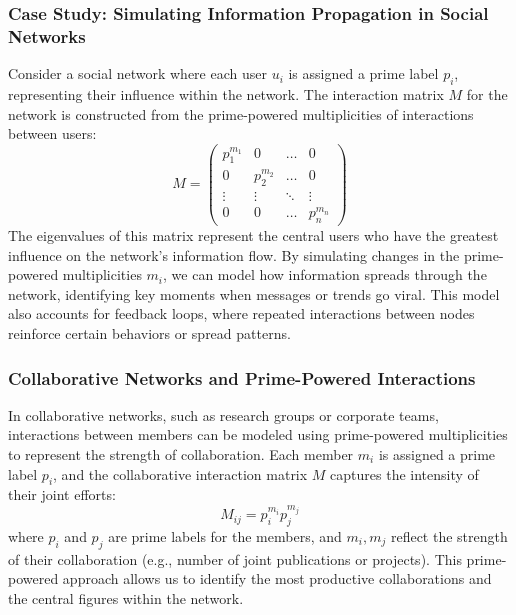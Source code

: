 \documentclass[%
 preprint, linenumbers,
 amsmath,amssymb,
 aps, physrev,
]{revtex4-2}
\begin{document}
\subsubsection{Case Study: Simulating Information Propagation in Social Networks}
Consider a social network where each user \( u_i \) is assigned a prime label \( p_i \), representing their influence within the network. The interaction matrix \( M \) for the network is constructed from the prime-powered multiplicities of interactions between users:
\[
M = \begin{pmatrix} p_1^{m_1} & 0 & \dots & 0 \\ 0 & p_2^{m_2} & \dots & 0 \\ \vdots & \vdots & \ddots & \vdots \\ 0 & 0 & \dots & p_n^{m_n} \end{pmatrix}
\]
The eigenvalues of this matrix represent the central users who have the greatest influence on the network's information flow. By simulating changes in the prime-powered multiplicities \( m_i \), we can model how information spreads through the network, identifying key moments when messages or trends go viral. This model also accounts for feedback loops, where repeated interactions between nodes reinforce certain behaviors or spread patterns.

\subsubsection{Collaborative Networks and Prime-Powered Interactions}
In collaborative networks, such as research groups or corporate teams, interactions between members can be modeled using prime-powered multiplicities to represent the strength of collaboration. Each member \( m_i \) is assigned a prime label \( p_i \), and the collaborative interaction matrix \( M \) captures the intensity of their joint efforts:
\[
M_{ij} = p_i^{m_i} p_j^{m_j}
\]
where \( p_i \) and \( p_j \) are prime labels for the members, and \( m_i, m_j \) reflect the strength of their collaboration (e.g., number of joint publications or projects). This prime-powered approach allows us to identify the most productive collaborations and the central figures within the network.
\end{document}
